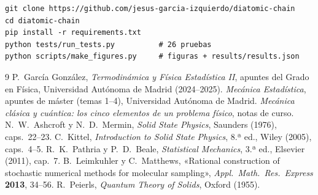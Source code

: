 \documentclass[11pt,a4paper]{article}
\begin{document}
\begin{verbatim}
git clone https://github.com/jesus-garcia-izquierdo/diatomic-chain
cd diatomic-chain
pip install -r requirements.txt
python tests/run_tests.py          # 26 pruebas
python scripts/make_figures.py     # figuras + results/results.json
\end{verbatim}

\begin{thebibliography}{9}
 P.~García González, \emph{Termodinámica y Física Estadística II},
  apuntes del Grado en Física, Universidad Autónoma de Madrid (2024--2025).
 \emph{Mecánica Estadística}, apuntes de máster (temas 1--4),
  Universidad Autónoma de Madrid.
 \emph{Mecánica clásica y cuántica: los cinco elementos de un
  problema físico}, notas de curso.
 N.~W.~Ashcroft y N.~D.~Mermin, \emph{Solid State Physics},
  Saunders (1976), caps.~22--23.
 C.~Kittel, \emph{Introduction to Solid State Physics}, 8.ª ed.,
  Wiley (2005), caps.~4--5.
 R.~K.~Pathria y P.~D.~Beale, \emph{Statistical Mechanics},
  3.ª ed., Elsevier (2011), cap.~7.
 B.~Leimkuhler y C.~Matthews, «Rational construction of stochastic
  numerical methods for molecular sampling», \emph{Appl.\ Math.\ Res.\ Express}
  \textbf{2013}, 34--56.
 R.~Peierls, \emph{Quantum Theory of Solids}, Oxford (1955).
\end{thebibliography}
\end{document}
